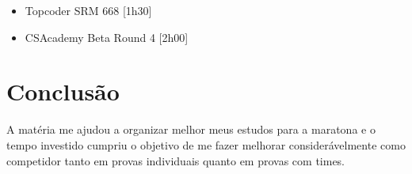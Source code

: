 \documentclass[a4paper, 11pt]{article} %
\begin{document}
\begin{itemize}
    \item Topcoder SRM 668 [1h30]
    \item CSAcademy Beta Round 4 [2h00]
\end{itemize}

\section*{Conclusão}
A matéria me ajudou a organizar melhor meus estudos para a maratona e o tempo investido cumpriu o objetivo de me fazer melhorar considerávelmente como competidor tanto em provas individuais quanto em provas com times.
\end{document}
